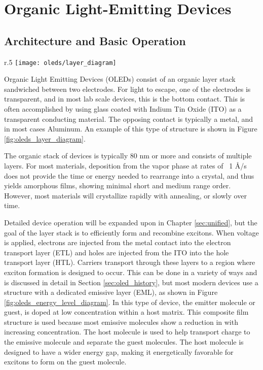 \documentclass[../thesis.tex]{subfiles}
\begin{document}
\chapter{Organic Light-Emitting Devices}\label{sec:oleds}

\section{Architecture and Basic Operation} \label{sec:oled_operation}

\begin{wrapfigure}{r}{.5\textwidth}
\centering
\texttt{[image: oleds/layer\_diagram]}
\caption{Basic layer diagram for OLED devices.}
\label{fig:oleds_layer_diagram}
\end{wrapfigure}

Organic Light Emitting Devices (OLEDs) consist of an organic layer stack sandwiched between two electrodes.
For light to escape, one of the electrodes is transparent, and in most lab scale devices, this is the bottom contact.
This is often accomplished by using glass coated with Indium Tin Oxide (ITO) as a transparent conducting material.
The opposing contact is typically a metal, and in most cases Aluminum.
An example of this type of structure is shown in Figure \ref{fig:oleds_layer_diagram}.

The organic stack of devices is typically 80 nm or more and consists of multiple layers.
For most materials, deposition from the vapor phase at rates of ~1 \r{A}/s does not provide the time or energy needed to rearrange into a crystal, and thus yields amorphous films, showing minimal short and medium range order.\supercite{Maldonis2017,Maldonis2015,Zhang2017,Zhang2016a}
However, most materials will crystallize rapidly with annealing,\supercite{Fielitz2016} or slowly over time.\supercite{Scholz2015}

Detailed device operation will be expanded upon in Chapter \ref{sec:unified}, but the goal of the layer stack is to efficiently form and recombine excitons.
When voltage is applied, electrons are injected from the metal contact into the electron transport layer (ETL) and holes are injected from the ITO into the hole transport layer (HTL).
Carriers transport through these layers to a region where exciton formation is designed to occur.  
This can be done in a variety of ways and is discussed in detail in Section \ref{sec:oled_history}, but most modern devices use a structure with a dedicated emissive layer (EML), as shown in Figure \ref{fig:oleds_energy_level_diagram}.
In this type of device, the emitter molecule or guest, is doped at low concentration within a host matrix.\supercite{Baldo2000}
This composite film structure is used because most emissive molecules show a reduction in \pl with increasing concentration.\supercite{Turro1991a}
The host molecule is used to help transport charge to the emissive molecule and separate the guest molecules.
The host molecule is designed to have a wider energy gap, making it energetically favorable for excitons to form on the guest molecule.
\end{document}
